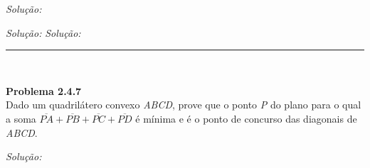 \documentclass[a4paper, 11pt]{book}
\newenvironment{problem}[2][Problema] 
    { \begin{mdframed}[backgroundcolor=gray!20] \textbf{#1 #2} \\}
    {  \end{mdframed}}
\newenvironment{solution}
    {\textit{Solução:}}
    {}
\begin{document}
\begin{solution}
{\begin{solution}
\begin{solution}
\end{solution}

\noindent\rule{7in}{2.8pt} \\

\begin{problem}{2.4.7}
    \label{prob:2.4.7}
    Dado um quadrilátero convexo \textit{ABCD}, prove que o ponto \textit{P} do plano para o qual a soma $\overline{PA} + \overline{PB} + \overline{PC} + \overline{PD}$ é mínima e é o ponto de concurso das diagonais de \textit{ABCD}.   
\end{problem}

\begin{solution}
    
\end{solution}
\end{document}
